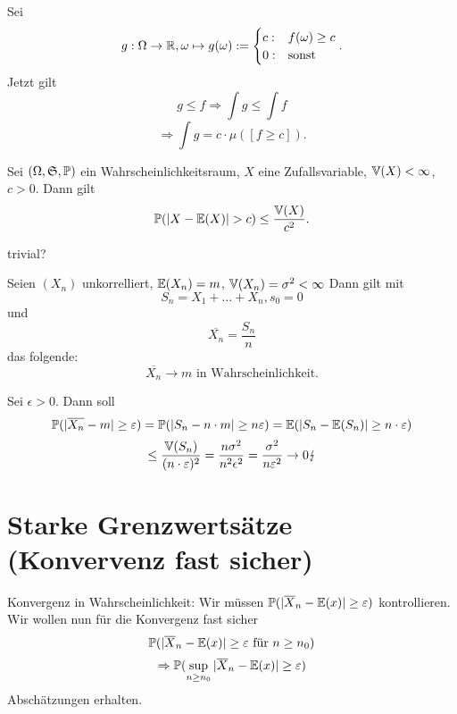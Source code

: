 			\begin{bew}
				Sei 
				\[ g: \Omega\to \mathbb{R}, \omega\mapsto g(\omega):=\begin{cases}
					c: & f(\omega)\ge c\\
					0: &\text{sonst}
				\end{cases}. \]
				Jetzt gilt
				\[ g\le f\Rightarrow\int g\le\int f \]
				\[ \Rightarrow \int g=c\cdot \mu([f\ge c]). \]
			\end{bew}
			
			\begin{satz}
				Sei $(\Omega,\mathfrak{S}, \mathbb{P})$ ein Wahrscheinlichkeitsraum, $X$ eine Zufallsvariable, $\mathbb{V}(X)<\infty$, $c>0$. Dann gilt
				\[ \P(|X-\E(X)|>c)\le\frac{\V(X)}{c^2}. \]				
			\end{satz}
			
			\begin{bew}
				trivial?
			\end{bew}
			
			\begin{satz}
				Seien $(X_n)$ unkorrelliert, $\mathbb{E}(X_n)=m$, $\mathbb{V}(X_n)=\sigma^2<\infty$ Dann gilt mit
				\[ S_n=X_1+...+X_n, s_0=0 \]
				und
				\[ \overline{X_n}=\frac{S_n}{n} \]
				das folgende:
				\[ \overline{X_n}\to m\text{ in Wahrscheinlichkeit.} \]
			\end{satz}
			
			\begin{bew}
				Sei $\epsilon >0$. Dann soll
				\[ \mathbb{P}(|\overline{X_n}-m|\ge \varepsilon)=\mathbb{P}(|S_n-n\cdot m|\ge n\varepsilon)=\mathbb{E}(|S_n-\mathbb{E}(S_n)|\ge n\cdot \varepsilon) \]
				\[ \le \frac{\mathbb{V}(S_n)}{(n\cdot \varepsilon)^2}=\frac{n\sigma^2}{n^2\epsilon^2}=\frac{\sigma^2}{n\varepsilon^2}\to 0\lightning \]
			\end{bew}
			
		\section[Starke Grenzwertsätze]{Starke Grenzwertsätze (Konvervenz fast sicher)}
			\begin{bem}
				Konvergenz in Wahrscheinlichkeit: Wir müssen $\mathbb{P}(|\overline{X}_n-\mathbb{E}(x)|\ge \varepsilon)$ kontrollieren. \newline
				Wir wollen nun für die Konvergenz fast sicher
				\[ \mathbb{P}(|\overline{X}_n-\mathbb{E}(x)|\ge \varepsilon\text{ für }n\ge n_0) \]
				\[ \Rightarrow \mathbb{P}(\sup_{n\ge n_0} |\overline{X}_n-\mathbb{E}(x)|\ge\varepsilon) \]
				Abschätzungen erhalten.
			\end{bem}
			
